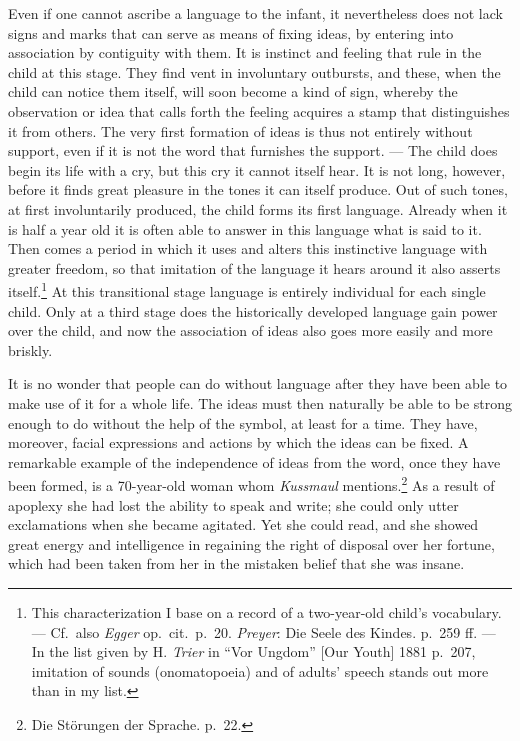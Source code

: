 \documentclass[12pt,a4paper]{book}
\newcommand{\opage}[1]{\marginnote{\footnotesize\textit{[#1]}}}
\begin{document}
Even if one cannot ascribe a language to the infant, it nevertheless
does not lack signs and marks that can serve as means of fixing ideas,
by entering into association by contiguity with them. It is instinct and
feeling that rule in the child at this stage. They find vent in
involuntary outbursts, and these, when the child can notice them itself,
will soon become a kind of sign, whereby the observation or idea that
calls forth the feeling acquires a stamp that distinguishes it from
others. The very first formation of ideas is thus not entirely without
support, even if it is not the word that furnishes the support. --- The
child does begin its life with a cry, but this cry it cannot itself
hear. It is not long, however, before it finds great pleasure in the
tones it can itself produce. Out of such tones, at first involuntarily
produced, the child forms its first language. Already when it is half a
year old it is often able to answer in this language what is said to it.
Then comes a period in which it uses and alters this instinctive
language with greater freedom, so that imitation of the language it
hears around it also
asserts itself.\footnote{This characterization I base on a record of a
two-year-old child's vocabulary. --- Cf.\ also \emph{Egger} op.\ cit.\
p.~20. \emph{Preyer}: Die Seele des Kindes. p.~259 ff. --- In the list
given by H. \emph{Trier} in ``Vor Ungdom'' [Our Youth] 1881 p.~207,
imitation of sounds (onomatopoeia) and of adults' speech stands out more
than in my list.} At this transitional stage language is entirely
individual for each single child. Only at a third stage does the
historically developed language gain power
\opage{207}over the child, and now the association of ideas also goes
more easily and more briskly.

It is no wonder that people can do without language after they have been
able to make use of it for a whole life. The ideas must then naturally
be able to be strong enough to do without the help of the symbol, at
least for a time. They have, moreover, facial expressions and actions by
which the ideas can be fixed. A remarkable example of the independence
of ideas from the word, once they have been formed, is a 70-year-old
woman whom \emph{Kussmaul} mentions.\footnote{Die Störungen der Sprache.
p.~22.} As a result of apoplexy she had lost the ability to speak and
write; she could only utter exclamations when she became agitated. Yet
she could read, and she showed great energy and intelligence in regaining
the right of disposal over her fortune, which had been taken from her in
the mistaken belief that she was insane.
\end{document}
